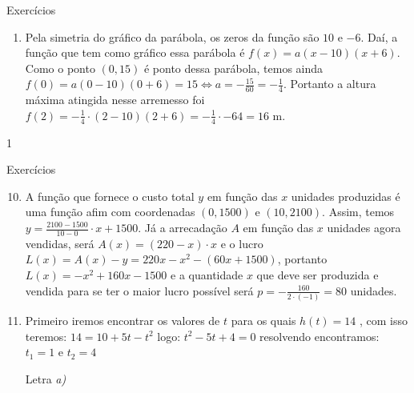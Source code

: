 {\begin{answer}{Exercícios}
{\begin{enumerate}
\item Pela simetria do gráfico da parábola, os zeros da função são \(10\) e \(-6\). Daí, a função que tem como gráfico essa parábola é \(f(x)=a(x-10)(x+6)\). Como o ponto \((0,15)\) é ponto dessa parábola, temos ainda \(f(0)=a(0-10)(0+6)=15 \Leftrightarrow a=-\frac{15}{60}=- \frac{1}{4}\). Portanto a altura máxima atingida nesse arremesso foi \(f(2)=- \frac{1}{4} \cdot (2-10)(2+6) = - \frac{1}{4} \cdot -64 = 16\) m.
\end{enumerate}
}{1}
\end{answer}
\clearmargin
\begin{answer}{Exercícios}
{\exerciselist
\begin{enumerate}\setcounter{enumi}{9}
\item A função que fornece o custo total \(y\) em função das \(x\) unidades produzidas é uma função afim com coordenadas \((0,1500)\) e \((10,2100)\). Assim, temos \(y= \frac{2100-1500}{10-0} \cdot x + 1500\). Já a arrecadação \(A\) em função das \(x\) unidades agora vendidas, será \(A(x)=(220-x) \cdot x\) e o lucro \(L(x)=A(x)-y=220x-x^2-(60x+1500)\), portanto \(L(x) = -x^2 +160x -1500\) e a quantidade \(x\) que deve ser produzida e vendida para se ter o maior lucro possível será \(p=- \frac{160}{2 \cdot (-1)} = 80\) unidades.



\item Primeiro iremos encontrar os valores de \(t\) para os quais \(h(t)=14\) , com isso teremos: \(14 = 10 +5t - t^2\) logo: \(t^2-5t+4=0\) resolvendo encontramos: \(t_1=1\) e \(t_2=4\)


Letra \textit{a)}


\end{enumerate}}
\end{answer}}
